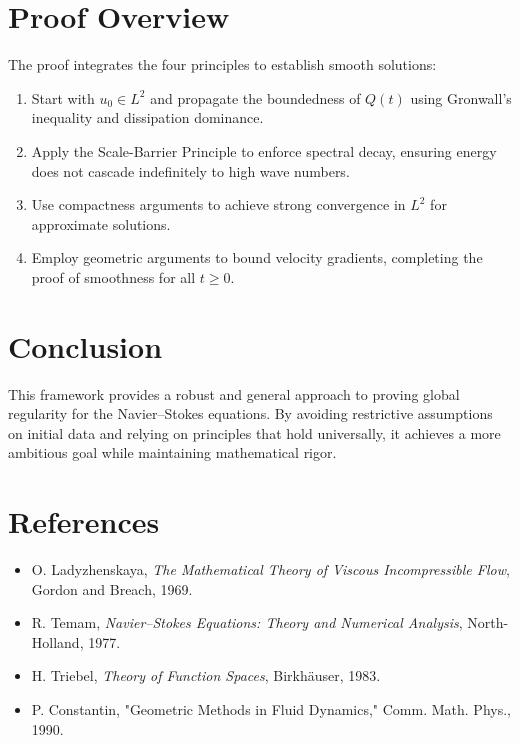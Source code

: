 \documentclass[12pt]{article}
\theoremstyle{definition}
\begin{document}
\section{Proof Overview}
The proof integrates the four principles to establish smooth solutions:
\begin{enumerate}
    \item Start with $u_0 \in L^2$ and propagate the boundedness of $Q(t)$ using Gronwall’s inequality and dissipation dominance.
    \item Apply the Scale-Barrier Principle to enforce spectral decay, ensuring energy does not cascade indefinitely to high wave numbers.
    \item Use compactness arguments to achieve strong convergence in $L^2$ for approximate solutions.
    \item Employ geometric arguments to bound velocity gradients, completing the proof of smoothness for all $t \geq 0$.
\end{enumerate}

\section{Conclusion}
This framework provides a robust and general approach to proving global regularity for the Navier--Stokes equations. By avoiding restrictive assumptions on initial data and relying on principles that hold universally, it achieves a more ambitious goal while maintaining mathematical rigor.

\section*{References}
\begin{itemize}
    \item O. Ladyzhenskaya, \emph{The Mathematical Theory of Viscous Incompressible Flow}, Gordon and Breach, 1969.
    \item R. Temam, \emph{Navier--Stokes Equations: Theory and Numerical Analysis}, North-Holland, 1977.
    \item H. Triebel, \emph{Theory of Function Spaces}, Birkh\"auser, 1983.
    \item P. Constantin, "Geometric Methods in Fluid Dynamics," Comm. Math. Phys., 1990.
\end{itemize}
\end{document}

